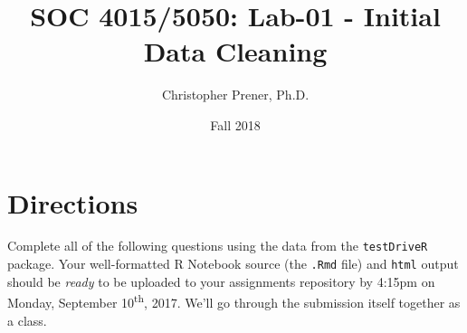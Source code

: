 \documentclass{tufte-handout}
\title{SOC 4015/5050: Lab-01 - Initial Data Cleaning }
\author{Christopher Prener, Ph.D.}
\date{Fall 2018}
\begin{document}
\maketitle %

\section{Directions}
Complete all of the following questions using the data from the \texttt{testDriveR} package. Your well-formatted R Notebook source (the \texttt{.Rmd} file) and \texttt{html} output should be \textit{ready} to be uploaded to your assignments repository by 4:15pm on Monday, September 10\textsuperscript{th}, 2017. We'll go through the submission itself together as a class.

\vspace{5mm}
\end{document}
